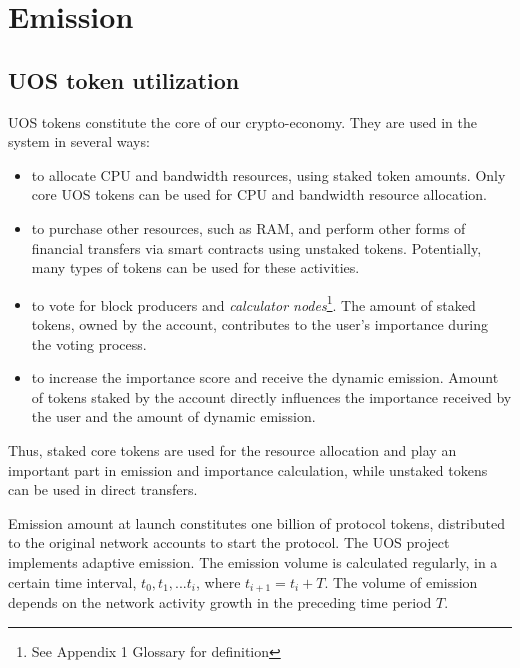 \documentclass[a4paper,12pt]{article}
\begin{document}
\section{Emission}

\subsection{U{\degree}OS token utilization}

U{\degree}OS tokens constitute the core of our crypto-economy. They are used in the system in several ways:

\begin{itemize}
\item to allocate CPU and bandwidth resources, using staked token amounts. Only core U{\degree}OS tokens can be used for CPU and bandwidth resource allocation.
\item to purchase other resources, such as RAM, and perform other forms of financial transfers via smart contracts using unstaked tokens. Potentially, many types of tokens can be used for these activities.
\item to vote for block producers and \emph{calculator nodes}\footnote{See Appendix 1 Glossary for definition}. The amount of staked tokens, owned by the account, contributes to the user's importance during the voting process.
\item to increase the importance score and receive the dynamic emission. Amount of tokens staked by the account directly influences the importance received by the user and the amount of dynamic emission.
\end{itemize}

Thus, staked core tokens are used for the resource allocation and play an important part in emission and importance calculation, while unstaked tokens can be used in direct transfers. 

Emission amount at launch constitutes one billion of protocol tokens, distributed to the original network accounts to start the protocol. The U{\degree}OS project implements adaptive emission. The emission volume is calculated regularly, in a certain time interval, $t_0, t_1, ... t_i$, where $t_{i+1} = t_i + T$. The volume of emission depends on the network activity growth in the preceding time period $T$.
\end{document}
